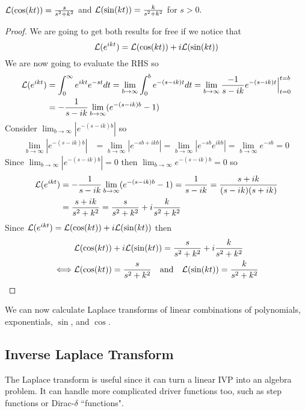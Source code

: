\documentclass[notes]{subfiles}
\begin{document}
\begin{theorem}
    $\mathcal{L} (\cos(kt)) = \frac{s}{s^2 + k^2}$ and $\mathcal{L} (\sin(kt)) = \frac{k}{s^2 + k^2}$ for $s > 0$.
\end{theorem}
\begin{proof}
    We are going to get both results for free if we notice that
    \[
        \mathcal{L} (e^{ikt}) = \mathcal{L} (\cos(kt)) + i\mathcal{L} (\sin(kt))
    \]
    We are now going to evaluate the RHS so
    \begin{align*}
        \mathcal{L} (e^{ikt})
        &= \int_0^\infty e^{ikt}e^{-st}dt
        = \lim_{b\to\infty} \int_0^b e^{-(s - ik)t}dt
        = \lim_{b\to\infty} \frac{-1}{s - ik}e^{-(s - ik)t} \Big|_{t = 0}^{t = b} \\
        &= -\frac{1}{s - ik} \lim_{b\to\infty} (e^{-(s - ik)b} - 1)
    \end{align*}
    Consider $\lim_{b\to\infty} |e^{-(s - ik)b}|$ so
    \begin{align*}
        \lim_{b\to\infty} |e^{-(s - ik)b}|
        &= \lim_{b\to\infty} |e^{-sb + ikb}|
        = \lim_{b\to\infty} |e^{-sb}e^{ikb}|
        = \lim_{b\to\infty} e^{-sb}
        = 0
    \end{align*}
    Since $\lim_{b\to\infty} |e^{-(s - ik)b}| = 0$ then $\lim_{b\to\infty} e^{-(s - ik)b} = 0$ so
    \begin{align*}
        \mathcal{L} (e^{ikt})
        &= -\frac{1}{s - ik} \lim_{b\to\infty} (e^{-(s - ik)b} - 1)
        = \frac{1}{s - ik}
        = \frac{s + ik}{(s - ik)(s + ik)} \\
        &= \frac{s + ik}{s^2 + k^2}
        = \frac{s}{s^2 + k^2} + i\frac{k}{s^2 + k^2}
    \end{align*}
    Since $\mathcal{L} (e^{ikt}) = \mathcal{L} (\cos(kt)) + i\mathcal{L} (\sin(kt))$ then
    \begin{align*}
        &\mathcal{L} (\cos(kt)) + i\mathcal{L} (\sin(kt)) = \frac{s}{s^2 + k^2} + i\frac{k}{s^2 + k^2} \\
        \iff& \mathcal{L} (\cos(kt)) = \frac{s}{s^2 + k^2} \quad \text{and} \quad \mathcal{L} (\sin(kt)) = \frac{k}{s^2 + k^2}
    \end{align*}
\end{proof}

We can now calculate Laplace transforms of linear combinations of polynomials, exponentials, $\sin$, and $\cos$.

\subsection{Inverse Laplace Transform}
The Laplace transform is useful since it can turn a linear IVP into an algebra problem. It can handle more complicated driver functions too, such as step functions or Dirac-$\delta$ ``functions".
\end{document}
